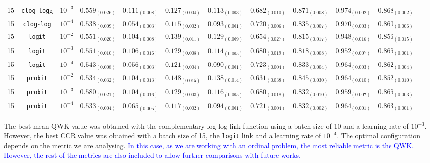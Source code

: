 \documentclass[journal]{IEEEtran}
\begin{document}
\begin{table}[!t]
\begin{tabular}{c@{\hskip 0.15cm}c@{\hskip 0.15cm}c@{\hskip 0.15cm}c@{\hskip 0.30cm}c@{\hskip 0.20cm}c@{\hskip 0.20cm}c@{\hskip 0.20cm}c@{\hskip 0.20cm}c@{\hskip 0.20cm}c@{\hskip 0.20cm}c}
			15 & \texttt{clog-log}g & $10^{-3}$ & $0.559_{(0.026)}$ & $\mathit{0.111_{(0.008)}}$ & $0.127_{(0.004)}$ & $0.113_{(0.003)}$ & $0.682_{(0.010)}$ & $0.871_{(0.008)}$ & $\mathit{0.974_{(0.002)}}$ & $\mathbf{0.868_{(0.002)}}$\\
			15 & \texttt{clog-log} & $10^{-4}$ & $0.538_{(0.009)}$ & $0.054_{(0.003)}$ & $\mathbf{0.115_{(0.002)}}$ & $\mathit{0.093_{(0.001)}}$ & $0.720_{(0.006)}$ & $0.835_{(0.007)}$ & $0.970_{(0.003)}$ & $0.860_{(0.006)}$\\
			15 & \texttt{logit} & $10^{-2}$ & $0.551_{(0.020)}$ & $0.104_{(0.008)}$ & $0.139_{(0.011)}$ & $0.129_{(0.009)}$ & $0.654_{(0.027)}$ & $0.815_{(0.017)}$ & $0.948_{(0.016)}$ & $0.856_{(0.015)}$\\
			15 & \texttt{logit} & $10^{-3}$ & $0.551_{(0.010)}$ & $0.106_{(0.016)}$ & $0.129_{(0.008)}$ & $0.114_{(0.005)}$ & $0.680_{(0.019)}$ & $0.818_{(0.008)}$ & $0.952_{(0.007)}$ & $\mathit{0.866_{(0.001)}}$\\
			15 & \texttt{logit} & $10^{-4}$ & $0.543_{(0.008)}$ & $0.056_{(0.003)}$ & $0.121_{(0.004)}$ & $\mathbf{0.090_{(0.001)}}$ & $\mathbf{0.723_{(0.004)}}$ & $0.833_{(0.004)}$ & $0.964_{(0.003)}$ & $0.862_{(0.004)}$\\
			15 & \texttt{probit} & $10^{-2}$ & $0.534_{(0.032)}$ & $0.104_{(0.013)}$ & $0.148_{(0.015)}$ & $0.138_{(0.014)}$ & $0.631_{(0.038)}$ & $0.845_{(0.030)}$ & $0.964_{(0.010)}$ & $0.852_{(0.010)}$\\
			15 & \texttt{probit} & $10^{-3}$ & $\mathit{0.580_{(0.021)}}$ & $0.104_{(0.016)}$ & $0.129_{(0.008)}$ & $0.116_{(0.005)}$ & $0.680_{(0.018)}$ & $0.832_{(0.010)}$ & $0.959_{(0.007)}$ & $0.866_{(0.003)}$\\
			15 & \texttt{probit} & $10^{-4}$ & $0.533_{(0.004)}$ & $0.065_{(0.005)}$ & $0.117_{(0.002)}$ & $0.094_{(0.001)}$ & $\mathit{0.721_{(0.004)}}$ & $0.832_{(0.002)}$ & $0.964_{(0.001)}$ & $0.863_{(0.001)}$\\
			\hline
			\hline
		\end{tabular}
	\end{table}
	
	The best mean QWK value was obtained with the complementary log-log link function using a batch size of 10 and a learning rate of $10^{-3}$. However, the best CCR value was obtained with a batch size of 15, the \texttt{logit} link and a learning rate of $10^{-4}$. The optimal configuration depends on the metric we are analysing. \textcolor{blue}{In this case, as we are working with an ordinal problem, the most reliable metric is the QWK. However, the rest of the metrics are also included to allow further comparisons with future works.}
	
\end{document}
